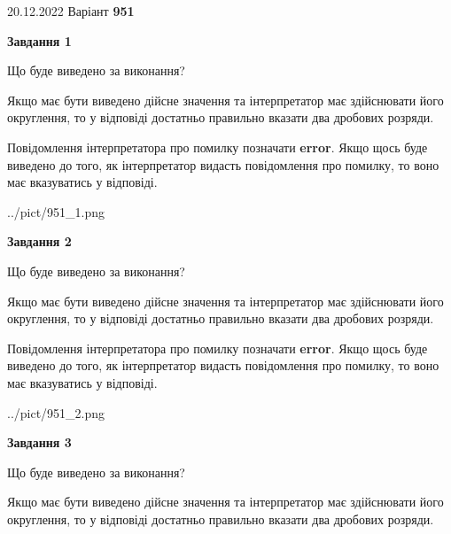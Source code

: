 \documentclass[12pt, ukrainian]{article}
\begin{document}
{20.12.2022 Варіант \No \textbf { 951 }\par}
{
\begin {Large}

{\begin {center}\textbf{Завдання 1}\end {center}}\par
Що буде виведено за виконання? \par

Якщо має бути виведено дійсне значення та інтерпретатор має здійснювати його округлення, 
то у відповіді достатньо правильно вказати два дробових розряди.

Повідомлення інтерпретатора про помилку позначати \textbf{error}.
Якщо щось буде виведено до того, як інтерпретатор видасть повідомлення про помилку, 
то воно має вказуватись у відповіді. \par

\begin{center}
	{../pict/951_1.png}
\end{center}
\newpage

{\begin {center}\textbf{Завдання 2}\end {center}}\par
Що буде виведено за виконання? \par

Якщо має бути виведено дійсне значення та інтерпретатор має здійснювати його округлення, 
то у відповіді достатньо правильно вказати два дробових розряди.

Повідомлення інтерпретатора про помилку позначати \textbf{error}.
Якщо щось буде виведено до того, як інтерпретатор видасть повідомлення про помилку, 
то воно має вказуватись у відповіді. \par

\begin{center}
	{../pict/951_2.png}
\end{center}
\newpage

{\begin {center}\textbf{Завдання 3}\end {center}}\par
Що буде виведено за виконання? \par

Якщо має бути виведено дійсне значення та інтерпретатор має здійснювати його округлення, 
то у відповіді достатньо правильно вказати два дробових розряди.


\end{Large}}
\end{document}
